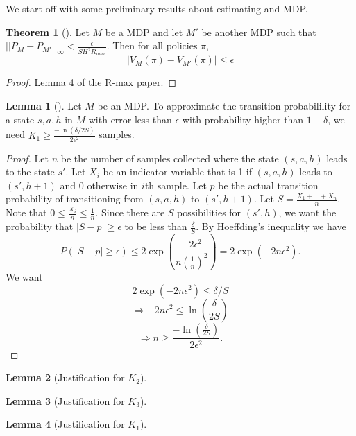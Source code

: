\documentclass[12pt, letterpaper]{article}
\theoremstyle{definition}
\newtheorem*{thm}{Theorem}
\newtheorem*{lemma}{Lemma}
\theoremstyle{remark}
\begin{document}
We start off with some preliminary results about estimating and MDP.

\begin{thm}[]
    Let \(M\) be a MDP and let \(M'\) be another MDP such that \(||P_{M} - P_{M'}||_{\infty} < \frac{\epsilon}{SH^2R_{max}}\). Then for all policies \(\pi\),
    \[|V_{M}(\pi) - V_{M'}(\pi)| \leq \epsilon\]
\end{thm}

\begin{proof}[Proof]
    Lemma 4 of the R-max paper.
\end{proof}

\begin{lemma}[]
    Let \(M\) be an MDP. To approximate the transition probabilility for a state \(s, a, h\) in \(M\) with error less than \(\epsilon\) with probability higher than \(1 - \delta\), we need \(K_1 \geq \frac{-\ln(\delta/2S)}{2\epsilon^2}\) samples.
\end{lemma}

\begin{proof}[Proof]
    Let \(n\) be the number of samples collected where the state \((s, a, h)\) leads to the state \(s'\). Let \(X_i\) be an indicator variable that is 1 if \((s, a, h)\) leads to \((s', h+1)\) and 0 otherwise in \(i\)th sample. Let \(p\) be the actual transition probability of transitioning from \((s, a, h)\) to \((s', h+1)\). Let \(S = \frac{X_1 + \ldots + X_{n}}{n}\). Note that \(0 \leq \frac{X_i}{n} \leq \frac{1}{n}\). Since there are \(S\) possibilities for \((s', h)\), we want the probability that \(|S - p| \geq \epsilon\) to be less than \(\frac{\delta}{S}\). By Hoeffding's inequality we have
    \[P(|S - p| \geq \epsilon) \leq 2 \exp (\frac{-2\epsilon^{2}}{n(\frac{1}{n})^2}) = 2 \exp(-2n\epsilon^2).\]
    We want
    \[2 \exp(-2n\epsilon^2) \leq \delta/S\]
    \[\Rightarrow -2n\epsilon^2 \leq \ln(\frac{\delta}{2S})\]
    \[\Rightarrow n \geq \frac{-\ln(\frac{\delta}{2S})}{2\epsilon^2}.\]
\end{proof}

\begin{lemma}[Justification for \(K_2\)]
    
\end{lemma}

\begin{lemma}[Justification for \(K_3\)]
    
\end{lemma}

\begin{lemma}[Justification for \(K_1\)]
    
\end{lemma}
\end{document}
